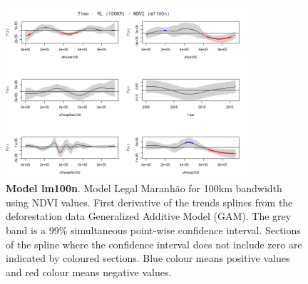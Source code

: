 \begin{table}


\begin{figure}[H]
 \centering
        \centering
        \includegraphics[width=0.8\textwidth]{ml100n.png} %
        \caption[Model Legal Maranhão for 100km bandwidth using NDVI values. First derivative of the trends splines from the deforestation data Generalized Additive Model (GAM)]{\textbf{Model lm100n}. Model Legal Maranhão for 100km bandwidth using NDVI values. First derivative of the trends splines from the deforestation data Generalized Additive Model (GAM). The grey band is a 99\% simultaneous point-wise confidence interval. Sections of the spline where the confidence interval does not include zero are indicated by coloured sections. Blue colour means positive values and red colour means negative values.}
        \centering
\end{figure}
\end{table}

